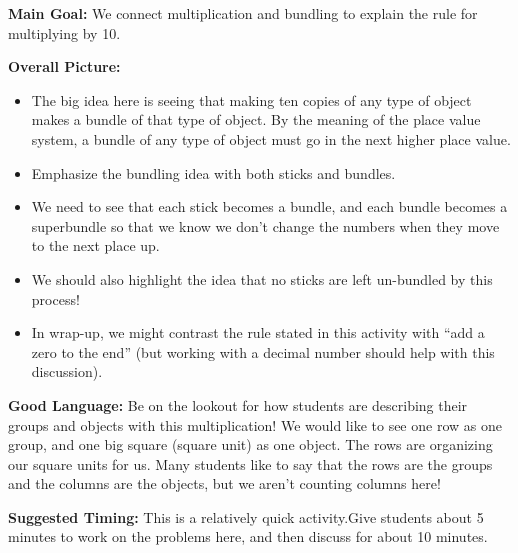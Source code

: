 \documentclass[handout]{ximera}
\begin{document}
\begin{instructorNotes}

{\bf Main Goal:} We connect multiplication and bundling to explain the rule for multiplying by 10.

{\bf Overall Picture:}
\begin{itemize}
	\item The big idea here is seeing that making ten copies of any type of object makes a bundle of that type of object. By the meaning of the place value system, a bundle of any type of object must go in the next higher place value.
	\item Emphasize the bundling idea with both sticks and bundles.
	\item We need to see that each stick becomes a bundle, and each bundle becomes a superbundle so that we know we don't change the numbers when they move to the next place up.
	\item We should also highlight the idea that no sticks are left un-bundled by this process!
	\item  In wrap-up, we might contrast the rule stated in this activity with  ``add a zero to the end'' (but working with a decimal number should help with this discussion). 
\end{itemize}

{\bf Good Language:} Be on the lookout for how students are describing their groups and objects with this multiplication! We would like to see one row as one group, and one big square (square unit) as one object. The rows are organizing our square units for us. Many students like to say that the rows are the groups and the columns are the objects, but we aren't counting columns here!

{\bf Suggested Timing:} This is a relatively quick activity.Give students about 5 minutes to work on the problems here, and then discuss for about 10 minutes.



\end{instructorNotes}
\end{document}
